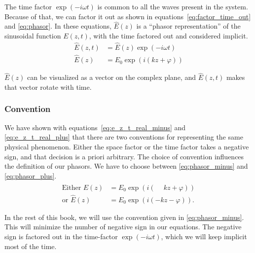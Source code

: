 The time factor $\exp({-i \omega t})$ is common to all the waves present in the system.
Because of that, we can factor it out as shown in equations~\ref{eq:factor_time_out} and \ref{eq:phasor}.
In these equations, $\hat{E}(z)$ is a ``phasor representation'' of the sinusoidal function $E(z, t)$, with the time factored out and considered implicit.
\begin{align}
    \hat{E}(z, t) &= \hat{E}(z) \exp(-i\omega t) \label{eq:factor_time_out}
    \\
    \hat{E}(z) &= E_0 \exp(i(kz+\varphi)) \label{eq:phasor}
\end{align}

$\hat{E}(z)$ can be visualized as a vector on the complex plane, and $\hat{E}(z, t)$ makes that vector rotate with time.


\subsubsection{Convention}
We have shown with equations~\ref{eq:e_z_t_real_minus} and \ref{eq:e_z_t_real_plus} that there are two conventions for representing the same physical phenomenon.
Either the space factor or the time factor takes a negative sign, and that decision is a priori arbitrary.
The choice of convention influences the definition of our phasors.
We have to choose between
\cref{eq:phasor_minus} and \cref{eq:phasor_plus}.
\begin{subequations}
    \begin{align}
        \text{Either }
        \hat{E}(z) &= E_0 \exp(i(\phantom{-}kz+\varphi))
        \label{eq:phasor_minus}
        \\
        \text{or }
        \hat{E}(z) &= E_0 \exp(i(-kz-\varphi))
        \text{.}
         \label{eq:phasor_plus}
    \end{align}    
\end{subequations}

In the rest of this book, we will use the convention given in \cref{eq:phasor_minus}.
This will minimize the number of negative sign in our equations.
The negative sign is factored out in the time-factor $\exp(-i \omega t)$, which we will keep implicit most of the time.





